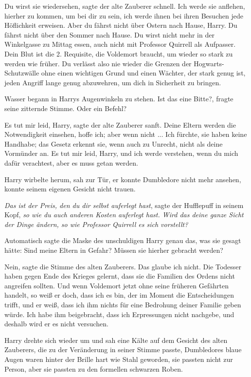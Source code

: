 \glqq{}Du wirst sie wiedersehen\grqq{}, sagte der alte Zauberer schnell. \glqq{}
Ich werde sie anflehen, hierher zu kommen, um bei dir zu sein, ich werde ihnen
bei ihren Besuchen jede Höflichkeit erweisen. Aber du fährst nicht über Ostern
nach Hause, Harry. Du fährst nicht über den Sommer nach Hause. Du wirst nicht
mehr in der Winkelgasse zu Mittag essen, auch nicht mit Professor Quirrell als
Aufpasser. Dein Blut ist die 2. Requisite, die Voldemort braucht, um wieder so
stark zu werden wie früher. Du verlässt also nie wieder die Grenzen der
Hogwarts-Schutzwälle ohne einen wichtigen Grund und einen Wächter, der stark
genug ist, jeden Angriff lange genug abzuwehren, um dich in Sicherheit zu
bringen.\grqq{}

Wasser begann in Harrys Augenwinkeln zu stehen. \glqq{}Ist das eine
Bitte?\grqq{}, fragte seine zitternde Stimme. \glqq{}Oder ein Befehl?\grqq{}

\glqq{}Es tut mir leid, Harry\grqq{}, sagte der alte Zauberer sanft. \glqq{}Deine
Eltern werden die Notwendigkeit einsehen, hoffe ich; aber wenn nicht ... Ich
fürchte, sie haben keine Handhabe; das Gesetz erkennt sie, wenn auch zu Unrecht,
nicht als deine Vormünder an. Es tut mir leid, Harry, und ich werde verstehen,
wenn du mich dafür verachtest, aber es muss getan werden.\grqq{}

Harry wirbelte herum, sah zur Tür, er konnte Dumbledore nicht mehr ansehen,
konnte seinem eigenen Gesicht nicht trauen.

\emph{Das ist der Preis, den du dir selbst auferlegt hast}, sagte der Hufflepuff
in seinem Kopf, \emph{so wie du auch anderen Kosten auferlegt hast. Wird das
deine ganze Sicht der Dinge ändern, so wie Professor Quirrell es sich
vorstellt?}

Automatisch sagte die Maske des unschuldigen Harry genau das, was sie gesagt
hätte: \glqq{}Sind meine Eltern in Gefahr? Müssen sie hierher gebracht
werden?\grqq{}

\glqq{}Nein\grqq{}, sagte die Stimme des alten Zauberers. \glqq{}Das glaube ich
nicht. Die Todesser haben gegen Ende des Krieges gelernt, dass sie die Familien
des Ordens nicht angreifen sollten. Und wenn Voldemort jetzt ohne seine früheren
Gefährten handelt, so weiß er doch, dass ich es bin, der im Moment die
Entscheidungen trifft, und er weiß, dass ich ihm nichts für eine Bedrohung
deiner Familie geben würde. Ich habe ihm beigebracht, dass ich Erpressungen
nicht nachgebe, und deshalb wird er es nicht versuchen.\grqq{}

Harry drehte sich wieder um und sah eine Kälte auf dem Gesicht des alten
Zauberers, die zu der Veränderung in seiner Stimme passte, Dumbledores blaue
Augen waren hinter der Brille hart wie Stahl geworden, sie passten nicht zur
Person, aber sie passten zu den formellen schwarzen Roben.

